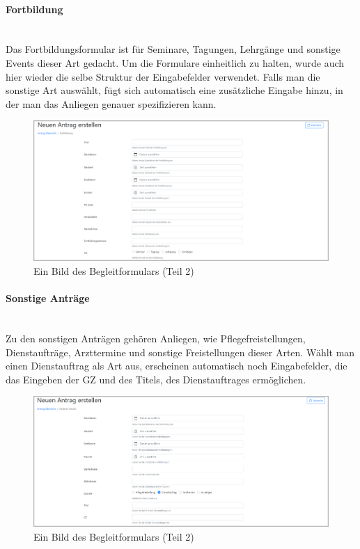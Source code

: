 \paragraph{Fortbildung}
~\\
Das Fortbildungsformular ist für Seminare, Tagungen, Lehrgänge und sonstige Events dieser Art gedacht. Um die Formulare einheitlich zu halten, wurde auch hier wieder die selbe Struktur der Eingabefelder verwendet. Falls man die sonstige Art auswählt, fügt sich automatisch eine zusätzliche Eingabe hinzu, in der man das Anliegen genauer spezifizieren kann.
\begin{figure}[H]
	\centering
	\includegraphics[width=1\linewidth]{images/website/fortbildung_1}
	\caption[Neuer Schulantrag]{Ein Bild des Begleitformulars (Teil 2)}
	\label{fig:frotbildung}
\end{figure}

\paragraph{Sonstige Anträge}
~\\
Zu den sonstigen Anträgen gehören Anliegen, wie Pflegefreistellungen, Dienstaufträge, Arzttermine und sonstige Freistellungen dieser Arten. Wählt man einen Dienstauftrag als Art aus, erscheinen automatisch noch Eingabefelder, die das Eingeben der GZ und des Titels, des Dienstauftrages ermöglichen.
\begin{figure}[H]
	\centering
	\includegraphics[width=1\linewidth]{images/website/dienstauftrag}
	\caption[Neuer Schulantrag]{Ein Bild des Begleitformulars (Teil 2)}
	\label{fig:dienst}
\end{figure}

